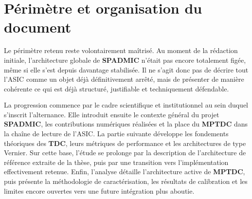 \section{Périmètre et organisation du document}

Le périmètre retenu reste volontairement maîtrisé. Au moment de la rédaction initiale, l’architecture globale de \textbf{SPADMIC} n’était pas encore totalement figée, même si elle s’est depuis davantage stabilisée. Il ne s’agit donc pas de décrire tout l’ASIC comme un objet déjà définitivement arrêté, mais de présenter de manière cohérente ce qui est déjà structuré, justifiable et techniquement défendable.

La progression commence par le cadre scientifique et institutionnel au sein duquel s’inscrit l’alternance. Elle introduit ensuite le contexte général du projet \textbf{SPADMIC}, les contributions numériques réalisées et la place du \textbf{MPTDC} dans la chaîne de lecture de l’ASIC. La partie suivante développe les fondements théoriques des \textbf{TDC}, leurs métriques de performance et les architectures de type Vernier. Sur cette base, l’étude se prolonge par la description de l’architecture de référence extraite de la thèse, puis par une transition vers l’implémentation effectivement retenue. Enfin, l'analyse détaille l’architecture active de \textbf{MPTDC}, puis présente la méthodologie de caractérisation, les résultats de calibration et les limites encore ouvertes vers une future intégration plus aboutie.

\clearpage
